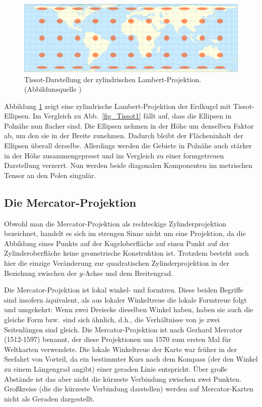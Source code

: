 \begin{figure}[htb]
\includegraphics[width=\textwidth]{./Bilder/Lambert.png}
\caption{\label{fig_Lambert}%
Tissot-Darstellung der zylindrischen Lambert-Projektion. (Abbildunsquelle \cite{WikiLambert})}
\end{figure}

Abbildung \ref{fig_Lambert} zeigt eine zylindrische Lambert-Projektion der Erdkugel mit 
Tissot-Ellipsen.
Im Vergleich zu Abb.\ \ref{fig_Tissot1} f\"allt auf, dass die Ellipsen in Poln\"ahe nun flacher sind.
Die Ellipsen nehmen in der H\"ohe um denselben Faktor ab, um den sie in der Breite zunehmen.
Dadurch bleibt der Fl\"acheninhalt der Ellipsen \"uberall derselbe. Allerdings werden die Gebiete in
Poln\"ahe auch st\"arker in der H\"ohe zusammengepresst und im Vergleich zu einer formgetreuen
Darstellung verzerrt. Nun werden beide diagonalen Komponenten im metrischen Tensor an den Polen
singul\"ar.

\subsection{Die Mercator-Projektion}  
\label{sec_Mercator}

Obwohl man die Mercator-Projektion 
als rechteckige Zylinderprojektion bezeichnet, handelt es sich
im strengen Sinne nicht um eine Projektion, da die Abbildung eines Punkts auf der Kugeloberfl\"ache
auf einen Punkt auf der Zylinderoberfl\"ache keine geometrische Konstruktion ist. Trotzdem besteht auch hier
die einzige Ver\"anderung zur quadratischen Zylinderprojektion in der Beziehung zwischen der
$y$-Achse und dem Breitengrad. 

Die Mercator-Projektion ist lokal winkel- und formtreu. Diese beiden Begriffe sind insofern
\"aquivalent, als aus lokaler Winkeltreue die lokale Formtreue folgt und umgekehrt: Wenn zwei
Dreiecke dieselben Winkel haben, haben sie auch die gleiche Form bzw.\ sind sich \"ahnlich, d.h., die 
Verh\"altnisse von je zwei Seitenl\"angen sind gleich. Die Mercator-Projektion ist nach Gerhard Mercator
(1512-1597) 
benannt, der diese Projektionen um 1570 zum ersten Mal f\"ur Weltkarten verwendete.
Die lokale Winkeltreue der Karte war fr\"uher in der Seefahrt von Vorteil, da ein bestimmter Kurs nach
dem Kompass (der den Winkel zu einem L\"angengrad angibt) einer geraden Linie entspricht. 
\"Uber gro\ss e Abst\"ande ist das aber nicht die k\"urzeste Verbindung zwischen zwei Punkten.
Gro\ss kreise (die die k\"urzeste Verbindung darstellen) werden auf Mercator-Karten nicht als
Geraden dargestellt. 

